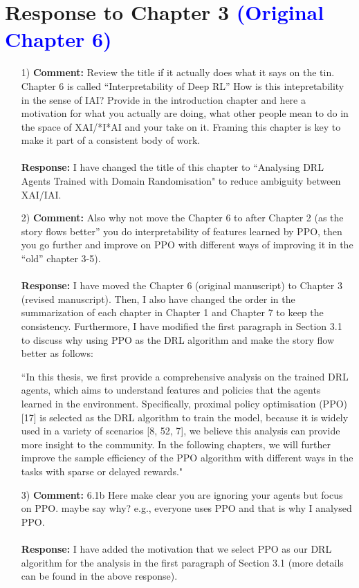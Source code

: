 \documentclass[11pt]{article}
\begin{document}
\section*{Response to Chapter 3 \textcolor{blue}{(Original Chapter 6)}}
\begin{enumerate}
\item[1)] \textbf{Comment:} Review the title if it actually does what it says on the tin. Chapter 6 is called “Interpretability of Deep RL” How is this intepretability in the sense of IAI? Provide in the introduction chapter and here a motivation for what you actually are doing, what other people mean to do in the space of XAI/*I*AI and your take on it. Framing this chapter is key to make it part of a consistent body of work.
\\ \\
\textbf{Response:} I have changed the title of this chapter to ``Analysing DRL Agents Trained with Domain Randomisation" to reduce ambiguity between XAI/IAI.

\item[2)] \textbf{Comment:} Also why not move the Chapter 6 to after Chapter 2 (as the story flows better” you do interpretability of features learned by PPO, then you go further and improve on PPO with different ways of improving it in the “old” chapter 3-5).\\ \\
\textbf{Response:} I have moved the Chapter 6 (original manuscript) to Chapter 3 (revised manuscript). Then, I also have changed the order in the summarization of each chapter in Chapter 1 and Chapter 7 to keep the consistency. Furthermore, I have modified the first paragraph in Section 3.1 to discuss why using PPO as the DRL algorithm and make the story flow better as follows:

``In this thesis, we first provide a comprehensive analysis on the trained DRL agents, which aims to understand features and policies that the agents learned in the environment. Specifically, proximal policy optimisation (PPO) [17] is selected as the DRL algorithm to train the model, because it is widely used in a variety of scenarios [8, 52, 7], we believe this analysis can provide more insight to the community. In the following chapters, we will further improve the sample efficiency of the PPO algorithm with different ways in the tasks with sparse or delayed rewards."

\item[3)] \textbf{Comment:} 6.1b Here make clear you are ignoring your agents but focus on PPO. maybe say why? e.g., everyone uses PPO and that is why I analysed PPO.\\ \\
\textbf{Response:} I have added the motivation that we select PPO as our DRL algorithm for the analysis in the first paragraph of Section 3.1 (more details can be found in the above response).


\end{enumerate}
\end{document}
